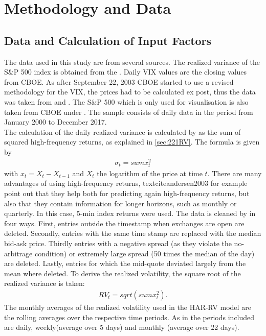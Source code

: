 
\section{Methodology and Data}\label{sec:4MethodData}

\subsection{Data and Calculation of Input Factors}\label{sec:41Data}
The data used in this study are from several sources. The realized variance of the S\&P 500 index is obtained from the \textcite{Oxford:RV}. Daily VIX values are the closing values from \gls{CBOE}. As after September 22, 2003 \gls{CBOE} started to use a revised methodology for the VIX, the prices had to be calculated ex post, thus the data was taken from \textcite{CBOE:old} and \textcite{CBOE:new}. The S\&P 500 which is only used for visualisation is also taken from \gls{CBOE} under \textcite{SandP}. The sample consists of daily data in the period from January 2000 to December 2017. \\
The calculation of the daily realized variance is calculated by \textcite{Oxford:RV} as the sum of squared high-frequency returns, as explained in \ref{sec:221RV}. The formula is given by 
\begin{align}
\sigma_{t} = sum x_{t}^{2}
\end{align}
with $x_{t} = X_{t} - X_{t-1}$ and $X_{t}$ the logarithm of the price at time $t$.  There are many advantages of using high-frequency returns, textcite{andersen2003} for example point out that they help both for predicting again high-frequency returns, but also that they contain information for longer horizons, such as monthly or quarterly. In this case, 5-min index returns were used. The data is cleaned by \textcite{Oxford:RV} in four ways. First, entries outside the timestamp when exchanges are open are deleted. Secondly, entries with the same time stamp are replaced with the median bid-ask price. Thirdly entries with a negative spread (as they violate the no-arbitrage condition) or extremely large spread (50 times the median of the day) are deleted. Lastly, entries for which the mid-quote deviated largely from the mean where deleted. To derive the realized volatility, the square root of the realized variance is taken:
\begin{align}
RV_{t} = sqrt(sum x_{t}^{2}).
\end{align}
The monthly averages of the realized volatility used in the HAR-RV model are the rolling averages over the respective time periods. As in \textcite{corsi2009} the periods included are daily, weekly(average over 5 days) and monthly (average over 22 days).  \\
